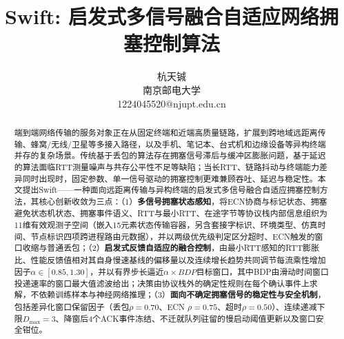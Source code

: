 \documentclass[10pt,twocolumn]{article}
\begin{document}

\title{\Large\textbf{Swift: 启发式多信号融合自适应网络拥塞控制算法}}

\author{
\normalsize 杭天铖 \\
\small 南京邮电大学 \\
\small 1224045520@njupt.edu.cn
}

\date{}

\maketitle


\begin{abstract}
\small
端到端网络传输的服务对象正在从固定终端和近端高质量链路，扩展到跨地域远距离传输、蜂窝/无线/卫星等多接入路径，以及手机、笔记本、台式机和边缘设备等异构终端并存的复杂场景。传统基于丢包的算法存在拥塞信号滞后与缓冲区膨胀问题，基于延迟的算法面临RTT测量噪声与共存公平性不足等缺陷；当长RTT、链路抖动与终端能力差异同时出现时，固定参数、单一信号驱动的拥塞控制更难兼顾吞吐、延迟与稳定性。本文提出Swift——一种面向远距离传输与异构终端的启发式多信号融合自适应拥塞控制方法，其核心创新收敛为三点：（1）\textbf{多信号拥塞状态感知}，将ECN协商与标记状态、拥塞避免状态机状态、拥塞事件语义、RTT与最小RTT、在途字节等协议栈内部信息组织为11维有效观测子空间（嵌入15元素状态传输容器，另含套接字标识、环境类型、仿真时间、节点标识四项跨进程路由元数据），并以两级优先级判定区分超时、ECN触发的窗口收缩与普通丢包；（2）\textbf{启发式反馈自适应的融合控制}，由最小RTT感知的RTT膨胀比、性能反馈值相对其自身慢速基线的偏移量以及连续增长趋势共同调节每流乘性增加因子$\alpha\in[0.85,1.30]$，并以有界步长逼近$\alpha\times BDP$目标窗口，其中BDP由滑动时间窗口投递速率的窗口最大值滤波给出；决策由协议栈外的确定性规则在每个确认事件上求解，不依赖训练样本与神经网络推理；（3）\textbf{面向不确定拥塞信号的稳定性与安全机制}，包括差异化窗口保留因子（丢包$\rho=0.70$、ECN $\rho=0.75$、超时$\rho=0.50$）、连续递减下限$D_{\max}=3$、降窗后4个ACK事件冻结、不迁就队列驻留的慢启动阈值更新以及窗口安全钳位。


\end{abstract}
\end{document}
